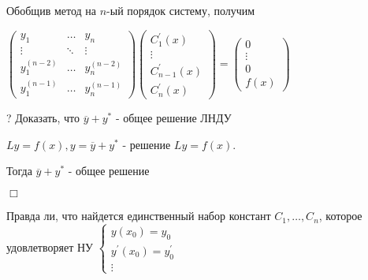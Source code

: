 \documentclass[12pt]{article}
\begin{document}
    \Nota Обобщив метод на $n$-ый порядок систему, получим

    $\begin{pmatrix}y_1 & \dots & y_n \\ \vdots & \ddots & \vdots \\ y^{(n - 2)}_1 & \dots & y^{(n - 2)}_n \\ y^{(n - 1)}_1 & \dots & y^{(n - 1)}_n\end{pmatrix}\begin{pmatrix}C^\prime_1(x) \\ \vdots \\ C^\prime_{n - 1}(x) \\ C^\prime_n(x)\end{pmatrix} = \begin{pmatrix}0 \\ \vdots \\ 0 \\ f(x)\end{pmatrix}$

    ? Доказать, что $\overline{y} + y^*$ - общее решение ЛНДУ


    \Th $Ly = f(x), y = \overline{y} + y^*$ - решение $Ly = f(x)$.

    Тогда $\overline{y} + y^*$ - общее решение

    $\Box$

    Правда ли, что найдется единственный набор констант $C_1, \dots, C_n$, которое удовлетворяет НУ $\begin{cases}y(x_0) = y_0 \\ y^\prime(x_0) = y_0^\prime \\ \vdots\end{cases}$
\end{document}
